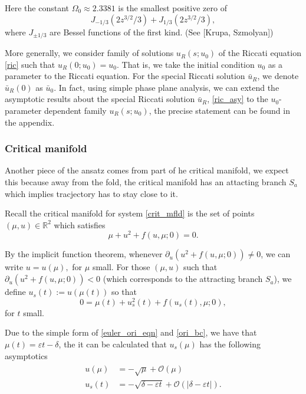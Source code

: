 \documentclass[letterpaper,11pt]{article}
\newcommand{\rmO}{\mathcal{O}}
\newcommand{\eps}{\varepsilon}
\numberwithin{equation}{section}
\theoremstyle{plain}
\begin{document}
Here the constant $\Omega_0 \approx 2.3381$ is the smallest positive zero of 
\[
J_{-1/3}(2z^{3/2}/3)+J_{1/3}(2z^{3/2}/3),
\]
where $J_{\pm 1/3}$ are Bessel functions of the first kind. (See [Krupa, Szmolyan])


More generally, we consider family of solutions  $u_R(s; u_0)$ of the Riccati equation  \eqref{ric} such that $u_R(0; u_0) = u_0$. That is, we take the initial condition $u_0$ as a parameter to the Riccati equation. For the special Riccati solution $\bar{u}_R$, we denote $\bar{u}_R(0) $ as $\bar{u}_0$. In fact, using simple phase plane analysis, we can extend the asymptotic results about the special Riccati solution $\bar{u}_R$, \eqref{ric_asy} to the $u_0$-parameter dependent family $u_R(s; u_0)$, the precise statement can be found in the appendix.

\subsubsection{Critical manifold}\label{c_mfld}
Another piece of the ansatz comes from part of  he critical manifold, we expect this because away from the fold, the critical manifold has an attacting branch $S_a$ which implies tracjectory has to stay close to it. 

Recall the critical manifold for system \eqref{crit_mfld} is the set of points $(\mu, u) \in \mathbb{R}^2$ which satisfies
\begin{equation} \label{crit_mfld}
\mu + u^2 + f(u,\mu; 0) =  0.
\end{equation}

By the implicit function theorem, whenever $\partial_u( u^2+f(u,\mu;0) ) \neq 0$, we can write $u=u(\mu),$ for $\mu$ small. For those $(\mu, u)$ such that $\partial_u( u^2+f(u,\mu;0) )<0$ (which corresponds to the attracting branch $S_a$), we define $u_s(t):= u(\mu(t))$ so that
\begin{equation}\label{singular}
0 = \mu(t) + u_s^2(t)+f(u_s(t),\mu; 0),
\end{equation}
for $t$ small.  

Due to the simple form of \eqref{euler_ori_eqn} and \eqref{ori_bc}, we have that $\mu(t)= \eps t-\delta$, the it can be calculated that $u_s(\mu)$ has the following asymptotics
\begin{align}\label{singularAsy}
\begin{split}
u(\mu) &= -\sqrt{\mu} + \rmO(\mu)\\
u_s(t) &= -\sqrt{\delta-\eps t} + \rmO(|\delta-\eps t|).
\end{split}
\end{align}
\end{document}
